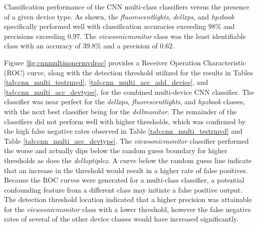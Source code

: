\begin{table}[tb]
	\caption{Classification performance of the CNN multi-class classifiers versus the presence of a given device type.  As shown, the \textit{fluorescentlights}, \textit{dellxps}, and \textit{hpzbook} specifically performed well with classification accuracies exceeding $98\%$ and precisions exceeding $0.97$.  The \textit{viewsonicmonitor} class was the least identifiable class with an accuracy of $39.8\%$ and a precision of $0.62$.}
	\centering
	\label{tab:cnn_multi_acc_devtype}
\end{table}

Figure \ref{fig:cnnmultinonermvdroc} provides a Receiver Operation Characteristic (ROC) curve, along with the detection threshold utilized for the results in Tables \ref{tab:cnn_multi_testrmvd}, \ref{tab:cnn_multi_acc_add_device}, and \ref{tab:cnn_multi_acc_devtype}, for the combined multi-device CNN classifier.  The classifier was near perfect for the \textit{dellxps}, \textit{fluorescentlights}, and \textit{hpzbook} classes, with the next best classifier being for the \textit{dellmonitor}.  The remainder of the classifiers did not perform well with higher thresholds, which was confirmed by the high false negative rates observed in Table \ref{tab:cnn_multi_testrmvd} and Table \ref{tab:cnn_multi_acc_devtype}.  The \textit{viewsonicmonitor} classifier performed the worse and actually dips below the random guess boundary for higher thresholds as does the \textit{delloptiplex}.  A curve below the random guess line indicate that an increase in the threshold would result in a higher rate of false positives.  Because the ROC curves were generated for a multi-class classifier, a potential confounding feature from a different class may initiate a false positive output.  The detection threshold location indicated that a higher precision was attainable for the \textit{viewsonicmonitor} class with a lower threshold, however the false negative rates of several of the other device classes would have increased significantly.

